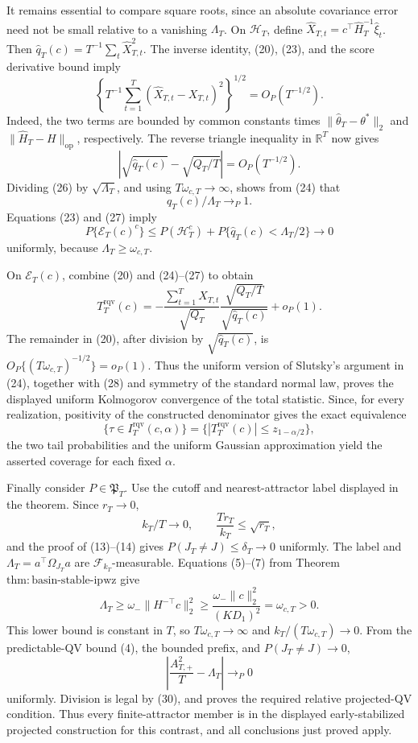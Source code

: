 It remains essential to compare square roots, since an absolute covariance error need not be small relative to a vanishing \(\Lambda_T\).  On \(\mathcal H_T\), define \(\widehat X_{T,t}=c^\top\widehat H_T^{-1}\widehat\xi_t\).  Then \(\widehat q_T(c)=T^{-1}\sum_t\widehat X_{T,t}^2\).  The inverse identity, (20), (23), and the score derivative bound imply
\[
 \left\{T^{-1}\sum_{t=1}^T(\widehat X_{T,t}-X_{T,t})^2\right\}^{1/2}
 =O_P(T^{-1/2}).                                                           \tag{25}
\]
Indeed, the two terms are bounded by common constants times \(\|\widehat\theta_T-\theta^*\|_2\) and \(\|\widehat H_T-H\|_{\mathrm{op}}\), respectively.  The reverse triangle inequality in \(\mathbb R^T\) now gives
\[
 \left|\sqrt{\widehat q_T(c)}-\sqrt{Q_T/T}\right|=O_P(T^{-1/2}).         \tag{26}
\]
Dividing (26) by \(\sqrt{\Lambda_T}\), and using \(T\omega_{c,T}\to\infty\), shows from (24) that
\[
 \widehat q_T(c)/\Lambda_T\to_P1.                                       \tag{27}
\]
Equations (23) and (27) imply
\[
 P\{\mathcal E_T(c)^c\}
 \le P(\mathcal H_T^c)+P\{\widehat q_T(c)<\Lambda_T/2\}\to0            \tag{28}
\]
uniformly, because \(\Lambda_T\ge\omega_{c,T}\).

On \(\mathcal E_T(c)\), combine (20) and (24)--(27) to obtain
\[
 T_T^{\mathrm{rqv}}(c)
 =-\frac{\sum_{t=1}^TX_{T,t}}{\sqrt{Q_T}}
   \frac{\sqrt{Q_T/T}}{\sqrt{\widehat q_T(c)}}+o_P(1).                  \tag{29}
\]
The remainder in (20), after division by \(\sqrt{\widehat q_T(c)}\), is \(O_P\{(T\omega_{c,T})^{-1/2}\}=o_P(1)\).  Thus the uniform version of Slutsky's argument in (24), together with (28) and symmetry of the standard normal law, proves the displayed uniform Kolmogorov convergence of the total statistic.  Since, for every realization, positivity of the constructed denominator gives the exact equivalence
\[
 \{\tau\in I_T^{\mathrm{rqv}}(c,\alpha)\}
 =\{|T_T^{\mathrm{rqv}}(c)|\le z_{1-\alpha/2}\},
\]
the two tail probabilities and the uniform Gaussian approximation yield the asserted coverage for each fixed \(\alpha\).

Finally consider \(P\in\mathfrak P_T\).  Use the cutoff and nearest-attractor label displayed in the theorem.  Since \(r_T\to0\),
\[
 k_T/T\to0,
 \qquad
 \frac{Tr_T}{k_T}\le\sqrt{r_T},
\]
and the proof of (13)--(14) gives \(P(J_T\ne J)\le\delta_T\to0\) uniformly.  The label and
\(\Lambda_T=a^\top\Omega_{J_T}a\) are \(\mathcal F_{k_T}\)-measurable.  Equations (5)--(7) from Theorem \(\mathrm{thm:basin\text{-}stable\text{-}ipwz}\) give
\[
 \Lambda_T\ge\omega_-\|H^{-\top}c\|_2^2
 \ge\frac{\omega_-\|c\|_2^2}{(KD_1)^2}=\omega_{c,T}>0.                 \tag{30}
\]
This lower bound is constant in \(T\), so \(T\omega_{c,T}\to\infty\) and \(k_T/(T\omega_{c,T})\to0\).  From the predictable-QV bound (4), the bounded prefix, and \(P(J_T\ne J)\to0\),
\[
 \left|\frac{A_{T,+}^2}{T}-\Lambda_T\right|\to_P0
\]
uniformly.  Division is legal by (30), and proves the required relative projected-QV condition.  Thus every finite-attractor member is in the displayed early-stabilized projected construction for this contrast, and all conclusions just proved apply.
